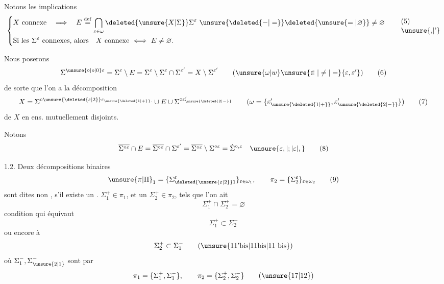 \begingroup
\makeatletter\tagsleft@true\makeatother

Notons les implications
\[
\left\{\begin{aligned}
&X\ \text{connexe}\quad\Longrightarrow\quad E\overset{\mathrm{def}}{=}\bigcap_{\varepsilon\in\omega}\deleted{\unsure{X|\Sigma}}\Sigma^\varepsilon\ \unsure{\deleted{-|=}}\deleted{\unsure{=|\varnothing}}\ne\varnothing\\
&\text{Si les }\Sigma^\varepsilon\ \text{connexes, alors}\quad X\ \text{connexe}\ \Longleftrightarrow\ E\ne\varnothing.
\end{aligned}\right.\tag*{\shortstack[l]{(5)\\\unsure{,|'}}}
\]

Nous poserons
\[
\Sigma^{\unsure{\circ|o|0}\varepsilon}=\Sigma^\varepsilon\setminus E=\Sigma^\varepsilon\setminus\Sigma^\varepsilon\cap\Sigma^{\varepsilon'}=X\setminus\Sigma^{\varepsilon'}\qquad(\unsure{\omega|w}\unsure{\in|\ne|=}\{\varepsilon,\varepsilon'\})\tag*{(6)}
\]
de sorte que l'on a la décomposition
\[
X=\Sigma^{\circ\unsure{\deleted{\varepsilon|2}}\varepsilon_{\unsure{\deleted{1|+}}.}}\cup E\cup\Sigma^{\circ\varepsilon'_{\unsure{\deleted{2|-}}}}\qquad(\omega=\{\varepsilon'_{\unsure{\deleted{1|+}}},\varepsilon'_{\unsure{\deleted{2|-}}}\})\tag*{(7)}
\]
de $X$ en  ens. mutuellement disjoints.

Notons
\[
\overline{\Sigma^{\circ\varepsilon}}\cap E=\overline{\Sigma^{\circ\varepsilon}}\cap\Sigma^{\varepsilon'}=\overline{\Sigma^{\circ\varepsilon}}\setminus\Sigma^{\circ\varepsilon}=\dot{\Sigma}^{\circ,\varepsilon}\quad\unsure{\varepsilon,|;|\varepsilon|,}\tag*{(8)}
\]

\par
{}

1.2. Deux décompositions binaires
\[
\unsure{\pi|\Pi}_1=\{\Sigma_{\deleted{\unsure{\varepsilon|2}}1}^\varepsilon\}_{\varepsilon\in\omega_1},\qquad\pi_2=\{\Sigma_2^\varepsilon\}_{\varepsilon\in\omega_2}\tag*{(9)}
\]
sont dites non \uline{},  s'il existe un . $\Sigma_1^+\in\pi_1$, et un $\Sigma_2^+\in\pi_2$, tels que l'on ait
\[
\Sigma_1^+\cap\Sigma_2^+=\varnothing\tag*{(10)}
\]
condition qui équivaut 
\[
\Sigma_1^+\subset\Sigma_2^-\tag*{(11)}
\]
ou encore à
\[
\Sigma_2^+\subset\Sigma_1^-\tag*{(\unsure{11'bis|11bis|11 bis})}
\]
où $\Sigma_1^-,\Sigma_{\unsure{2|1}}^-$ sont  par
\[
\pi_1=\{\Sigma_1^+,\Sigma_1^-\},\qquad\pi_2=\{\Sigma_2^+,\Sigma_2^-\}\tag*{(\unsure{17|12})}
\]
\endgroup
